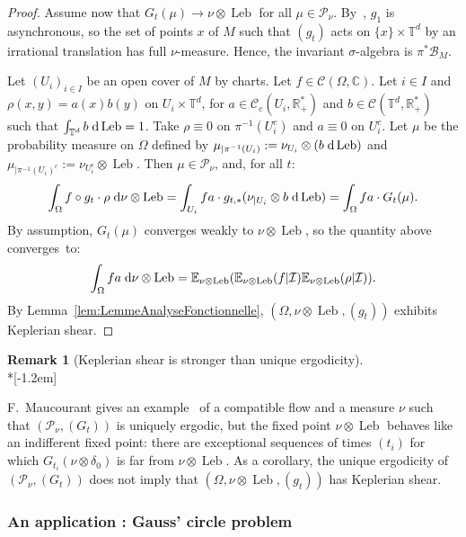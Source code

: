 \documentclass[10pt]{amsart}
\theoremstyle{definition}\newtheorem{defi}[theo]{Definition}\newtheorem{rema}[theo]{Remark}\newtheorem{exam}[theo]{Example}\newtheorem{exem}[theo]{Example}\newtheorem{nota}[theo]{Notation}
\DeclareMathOperator{\Leb}{Leb}
\newcommand{\R}{\mathbb{R}}
\newcommand{\Cbb}{\mathbb{C}}
\newcommand{\Ebb}{\mathbb{E}}
\newcommand{\Tbb}{\mathbb{T}}
\newcommand{\Bcal}{\mathcal{B}}
\newcommand{\Ccal}{\mathcal{C}}
\newcommand{\Ical}{\mathcal{I}}
\newcommand{\Pcal}{\mathcal{P}}
\newcommand{\dd}{\;{\rm d}}
\begin{document}
\begin{proof}

Assume now that $G_t (\mu) \to \nu \otimes \Leb$ for all $\mu \in \Pcal_\nu$. By~\cite[Theorem~1]{Maucourant:2016}, $g_1$ is asynchronous, so the set of points $x$ of $M$ such that $(g_t)$ acts on $\{x\} \times \Tbb^d$ by an irrational translation has full $\nu$-measure. Hence, the invariant $\sigma$-algebra is $\pi^* \Bcal_M$.


Let $(U_i)_{i \in I}$ be an open cover of $M$ by charts. Let $f \in \Ccal (\Omega, \Cbb)$. Let $i \in I$ and $\rho (x,y) = a(x) b(y)$ on $U_i \times \Tbb^d$, for $a \in \Ccal_c (U_i, \R_+^*)$ and $b \in \Ccal (\Tbb^d, \R_+^*)$ such that $\int_{\Tbb^d} b \dd \Leb = 1$. Take $\rho \equiv 0$ on $\pi^{-1}(U_i^c)$ and $a \equiv 0$ on $U_i^c$. Let $\mu$ be the probability measure on $\Omega$ defined by $\mu_{|\pi^{-1}(U_i)} := \nu_{U_i} \otimes (b \dd \Leb)$ and $\mu_{|\pi^{-1}(U_i)^c} := \nu_{U_i^c} \otimes \Leb$. Then $\mu \in \Pcal_\nu$, and, for all $t$:
\[
\int_\Omega f \circ g_t \cdot \rho \dd \nu \otimes \Leb = \int_{U_i} fa \cdot g_{t,*} (\nu_{|U_i} \otimes b \dd \Leb) = \int_\Omega fa \cdot G_t (\mu).
\]
By assumption, $G_t (\mu)$ converges weakly to $\nu \otimes \Leb$, so the quantity above converges~to:
\[
\int_\Omega fa \dd \nu \otimes \Leb = \Ebb_{\nu \otimes \Leb} (\Ebb_{\nu \otimes \Leb} (f|\Ical) \Ebb_{\nu \otimes \Leb} (\rho|\Ical)).
\]
By Lemma~\ref{lem:LemmeAnalyseFonctionnelle}, $(\Omega, \nu \otimes \Leb, (g_t))$ exhibits Keplerian shear.
\end{proof}


\begin{rema}[Keplerian shear is stronger than unique ergodicity]\ \\*[-1.2em]

F.~Maucourant gives an example~\cite{Maucourant:2016} of a compatible flow and a measure $\nu$ such that $(\Pcal_\nu, (G_t))$ is uniquely ergodic, but the fixed point $\nu \otimes \Leb$ behaves like an indifferent fixed point: there are exceptional sequences of times $(t_i)$ for which $G_{t_i} (\nu \otimes \delta_0)$ is far from $\nu \otimes \Leb$. As a corollary, the unique ergodicity of $(\Pcal_\nu, (G_t))$ does not imply that $(\Omega, \nu \otimes \Leb, (g_t))$ has Keplerian shear.
\end{rema}


\subsubsection{An application : Gauss' circle problem}\label{subsubsec:Gauss}
\end{document}
